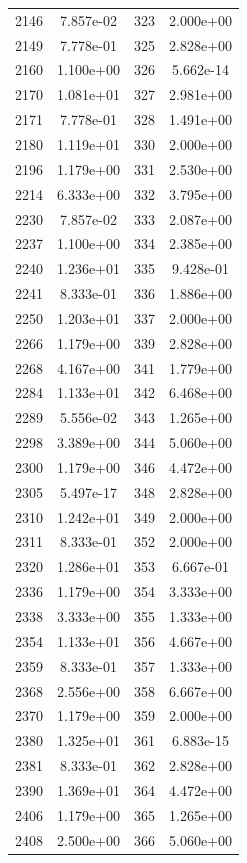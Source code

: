 \documentclass[12pt]{article}
\begin{document}
\begin{longtable}{@{}cccc@{}}
2146 & 7.857e-02 & 323 & 2.000e+00 \\
2149 & 7.778e-01 & 325 & 2.828e+00 \\
2160 & 1.100e+00 & 326 & 5.662e-14 \\
2170 & 1.081e+01 & 327 & 2.981e+00 \\
2171 & 7.778e-01 & 328 & 1.491e+00 \\
2180 & 1.119e+01 & 330 & 2.000e+00 \\
2196 & 1.179e+00 & 331 & 2.530e+00 \\
2214 & 6.333e+00 & 332 & 3.795e+00 \\
2230 & 7.857e-02 & 333 & 2.087e+00 \\
2237 & 1.100e+00 & 334 & 2.385e+00 \\
2240 & 1.236e+01 & 335 & 9.428e-01 \\
2241 & 8.333e-01 & 336 & 1.886e+00 \\
2250 & 1.203e+01 & 337 & 2.000e+00 \\
2266 & 1.179e+00 & 339 & 2.828e+00 \\
2268 & 4.167e+00 & 341 & 1.779e+00 \\
2284 & 1.133e+01 & 342 & 6.468e+00 \\
2289 & 5.556e-02 & 343 & 1.265e+00 \\
2298 & 3.389e+00 & 344 & 5.060e+00 \\
2300 & 1.179e+00 & 346 & 4.472e+00 \\
2305 & 5.497e-17 & 348 & 2.828e+00 \\
2310 & 1.242e+01 & 349 & 2.000e+00 \\
2311 & 8.333e-01 & 352 & 2.000e+00 \\
2320 & 1.286e+01 & 353 & 6.667e-01 \\
2336 & 1.179e+00 & 354 & 3.333e+00 \\
2338 & 3.333e+00 & 355 & 1.333e+00 \\
2354 & 1.133e+01 & 356 & 4.667e+00 \\
2359 & 8.333e-01 & 357 & 1.333e+00 \\
2368 & 2.556e+00 & 358 & 6.667e+00 \\
2370 & 1.179e+00 & 359 & 2.000e+00 \\
2380 & 1.325e+01 & 361 & 6.883e-15 \\
2381 & 8.333e-01 & 362 & 2.828e+00 \\
2390 & 1.369e+01 & 364 & 4.472e+00 \\
2406 & 1.179e+00 & 365 & 1.265e+00 \\
2408 & 2.500e+00 & 366 & 5.060e+00 \\

\end{longtable}
\end{document}
